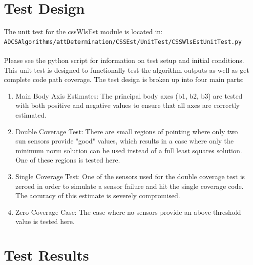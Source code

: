 \documentclass[]{LASPreport}
\begin{document}
\section{Test Design}
The unit test for the cssWlsEst module is located in:\\

\noindent
{\tt ADCSAlgorithms/attDetermination/CSSEst/UnitTest/CSSWlsEstUnitTest.py} \\
\\

Please see the python script for information on test setup and initial 
conditions.  \\

\noindent This unit test is designed to functionally test the algorithm 
outputs as well as get complete code path coverage.  The test design is broken 
up into four main parts:\\
\begin{enumerate}
\item{Main Body Axis Estimates: The principal body axes (b1, b2, b3) are tested 
   with both positive and negative values to ensure that all axes are correctly 
   estimated.}
\item{Double Coverage Test: There are small regions of pointing where only two 
   sun sensors provide "good" values, which results in a case where only the 
   minimum norm solution can be used instead of a full least squares solution.  
   One of these regions is tested here.}
\item{Single Coverage Test: One of the sensors used for the double coverage test 
   is zeroed in order to simulate a sensor failure and hit the single coverage 
   code.  The accuracy of this estimate is severely compromised.}
\item{Zero Coverage Case: The case where no sensors provide an above-threshold 
   value is tested here.}
\end{enumerate}


\section{Test Results}
\end{document}
